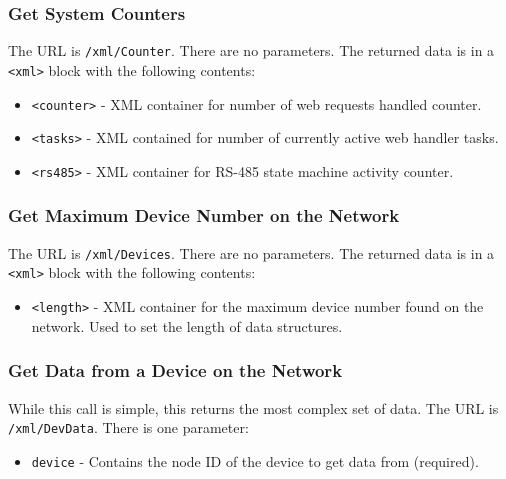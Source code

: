 \documentclass[10pt, openany, draft]{article}
\begin{document}
\subsubsection{Get System Counters}
The URL is \texttt{/xml/Counter}.  There are no parameters.  The returned data is in a \texttt{<xml>} block with the following contents:
\begin{itemize}
  \item \texttt{<counter>} - XML container for number of web requests handled counter.
  \item \texttt{<tasks>} - XML contained for number of currently active web handler tasks.
  \item \texttt{<rs485>} - XML container for RS-485 state machine activity counter.
\end{itemize}

\subsubsection{Get Maximum Device Number on the Network}
The URL is \texttt{/xml/Devices}.  There are no parameters.  The returned data is in a \texttt{<xml>} block with the following contents:
\begin{itemize}
  \item \texttt{<length>} - XML container for the maximum device number found on the network.  Used to set the length of data structures.
\end{itemize}

\subsubsection{Get Data from a Device on the Network}
While this call is simple, this returns the most complex set of data.  The URL is \texttt{/xml/DevData}.  There is one parameter:
\begin{itemize}
  \item \texttt{device} - Contains the node ID of the device to get data from (required).
\end{itemize}
\end{document}
